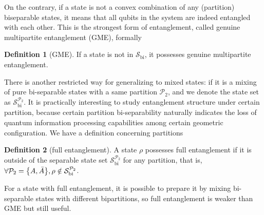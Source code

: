 \documentclass[
reprint,
aps,
pra,
floatfix,
]{revtex4-2}
\theoremstyle{plain}
\theoremstyle{definition}
\newtheorem{definition}{Definition}
\newcommand{\dm}{\rho}
\newcommand{\bi}{\text{bi}}
\newcommand{\separable}{\mathcal{S}}
\newcommand{\ppartition}{\mathcal{P}}
\begin{document}
On the contrary, if a state is not a convex combination of any (partition) biseparable states,
it means that all qubits in the system are indeed entangled with each other.
This is the strongest form of entanglement, called genuine multipartite entanglement (GME), formally
\begin{definition}[GME]\label{def:gme}
	If a state is not in $\separable_\bi$,
	it possesses genuine multipartite entanglement.
\end{definition}

There is another restricted way for generalizing to mixed states: 
if it is a mixing of pure bi-separable states with a same partition $\ppartition_2$, 
and we denote the state set as $\separable_{\bi}^{\ppartition_2}$. 
It is practically interesting to study entanglement structure under certain partition,
because certain partition bi-separability naturally indicates the loss of quantum information processing capabilities among certain geometric configuration.
We have a definition concerning partitions
\begin{definition}[full entanglement]\label{def:full_entanglement}
	A state $\dm$ possesses full entanglement
	if it is outside of the separable state set $\separable_{\bi}^{\ppartition_2}$ for any partition,
	that is, $\forall \ppartition_2 = \qty{A,\bar{A}},\dm \notin \separable_\bi^{\ppartition_2}$.
\end{definition}
For a state with full entanglement, it is possible to prepare it by mixing bi-separable states with different bipartitions,
so full entanglement is weaker than GME but still useful.
\end{document}
